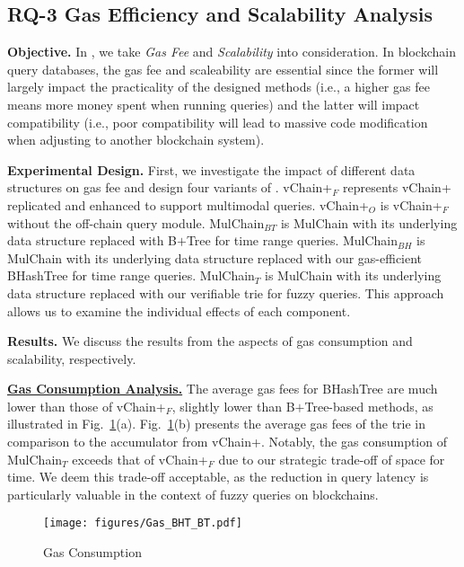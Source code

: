 \subsection{RQ-3 Gas Efficiency and Scalability Analysis}
\label{sec:rq3}


\noindent
\textbf{Objective.}
In \Chain, we take \textit{Gas Fee} and \textit{Scalability} into consideration.
In blockchain query databases, the gas fee and scaleability are essential since the former will largely impact the practicality of the designed methods (i.e., a higher gas fee means more money spent when running queries) and the latter will impact compatibility (i.e., poor compatibility will lead to massive code modification when adjusting to another blockchain system).

\noindent
\textbf{Experimental Design.}
First, we investigate the impact of different data structures on gas fee and design four variants of \Chain. 
vChain+$_{F}$ represents vChain+ replicated and enhanced to support multimodal queries.
vChain+$_{O}$ is vChain+$_{F}$ without the off-chain query module.
MulChain$_{BT}$ is MulChain with its underlying data structure replaced with B\(+\)Tree for time range queries.
MulChain$_{BH}$ is MulChain with its underlying data structure replaced with our gas-efficient BHashTree for time range queries.
MulChain$_{T}$ is MulChain with its underlying data structure replaced with our verifiable trie for fuzzy queries.
This approach allows us to examine the individual effects of each component.


\noindent
\textbf{Results.} We discuss the results from the aspects of gas consumption and scalability, respectively.




\noindent
\textbf{\underline{Gas Consumption Analysis.}}
The average gas fees for BHashTree are much lower than those of vChain+$_{F}$, slightly lower than B\(+\)Tree-based methods, as illustrated in Fig.~\ref{fig:Gas Consumption}(a).
Fig.~\ref{fig:Gas Consumption}(b) presents the average gas fees of the trie in comparison to the accumulator from vChain+. 
Notably, the gas consumption of MulChain$_{T}$ exceeds that of vChain+$_{F}$ due to our strategic trade-off of space for time. 
We deem this trade-off acceptable, as the reduction in query latency is particularly valuable in the context of fuzzy queries on blockchains.




\begin{figure}[htbp]
    \centering
    \texttt{[image: figures/Gas\_BHT\_BT.pdf]}
    \caption{Gas Consumption}
    \label{fig:Gas Consumption}
\end{figure}


